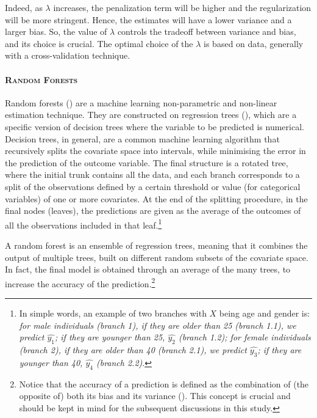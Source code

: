 \documentclass[12pt,a4paper,openright,twoside]{book}
\begin{document}
\begin{doublespacing}
Indeed, as $\lambda$ increases, the penalization term will be higher and the regularization will be more stringent. Hence, the estimates will have a lower variance and a larger bias. So, the value of $\lambda$ controls the tradeoff between variance and bias, and its choice is crucial. The optimal choice of the $\lambda$ is based on data, generally with a cross-validation technique. 




\paragraph{\scshape Random Forests}\label{rf}
Random forests (\citealp{breiman2001random}) are a machine learning non-parametric and non-linear estimation technique. They are constructed on
regression trees (\citealp{breiman2017classification}), which are a specific version of decision trees where the variable to be predicted is numerical. Decision trees, in general, are a common machine learning algorithm that recursively splits the covariate space into intervals, while minimising the error in the prediction of the outcome variable. The final structure is a rotated tree, where the initial trunk contains all the data, and each branch corresponds to a split of the observations defined by a certain threshold or value (for categorical variables) of one or more covariates. At the end of the splitting procedure, in the final nodes (leaves), the predictions are given as the average of the outcomes of all the observations included in that leaf.\footnote{In simple words, an example of two branches with $X$ being age and gender is: \textit{for male individuals (branch 1), if they are older than 25 (branch 1.1), we predict $\hat{y_1}$; if they are younger than 25, $\hat{y_2}$ (branch 1.2); for female individuals (branch 2), if they are older than 40 (branch 2.1), we predict $\hat{y_3}$; if they are younger than 40, $\hat{y_4}$ (branch 2.2)}.}  


A random forest is an ensemble of regression trees, meaning that it combines the output of multiple trees, built on different random subsets of the covariate space. In fact, the final model is obtained through an average of the many trees, to increase the accuracy of the prediction.\footnote{Notice that the accuracy of a prediction is defined as the combination of (the opposite of) both its bias and its variance (\citealp{walther2005concepts}). This concept is crucial and should be kept in mind for the subsequent discussions in this study.}


\end{doublespacing}
\end{document}
